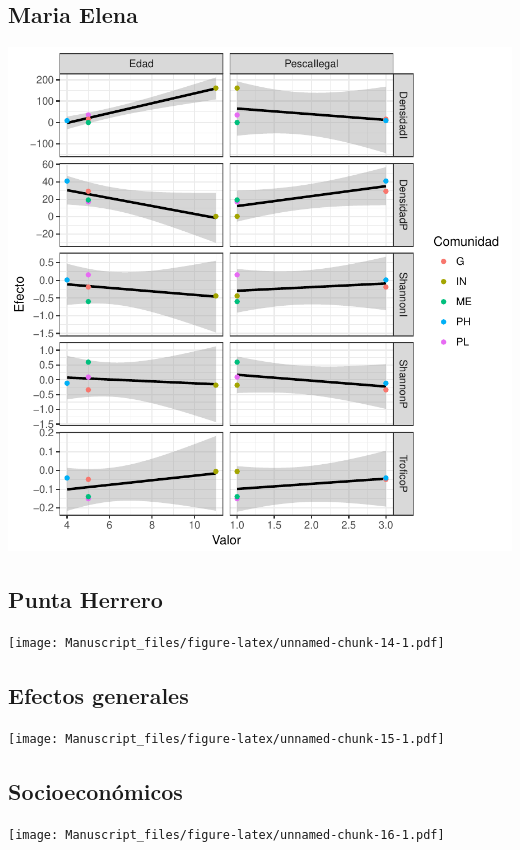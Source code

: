 \documentclass[12pt,]{article}
\begin{document}
\subsection{Maria Elena}\label{maria-elena-1}

\includegraphics{Manuscript_files/figure-latex/unnamed-chunk-13-1.pdf}

\subsection{Punta Herrero}\label{punta-herrero-1}

\texttt{[image: Manuscript\_files/figure-latex/unnamed-chunk-14-1.pdf]}

\subsection{Efectos generales}\label{efectos-generales}

\texttt{[image: Manuscript\_files/figure-latex/unnamed-chunk-15-1.pdf]}

\subsection{Socioeconómicos}\label{socioeconomicos}

\texttt{[image: Manuscript\_files/figure-latex/unnamed-chunk-16-1.pdf]}
\end{document}
